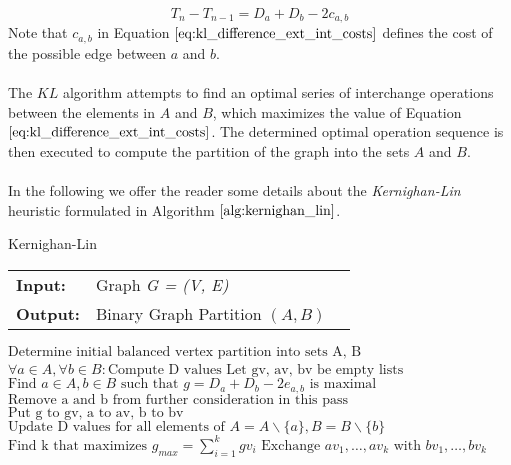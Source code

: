 \begin{equation}
	T_{n} - T_{n-1} = D_a + D_b - 2c_{a,b}
\label{eq:kl_difference_ext_int_costs}
\end{equation}
Note that $c_{a,b}$ in Equation $\ref{eq:kl_difference_ext_int_costs}$ defines the cost of the possible edge between $a$ and $b$. \\ \\
The $KL$ algorithm attempts to find an optimal series of interchange operations between the elements in $A$ and $B$, which maximizes the value of Equation $\ref{eq:kl_difference_ext_int_costs}$. The determined optimal operation sequence is then executed to compute the partition of the graph into the sets $A$ and $B$. \\ \\
In the following we offer the reader some details about the \emph{Kernighan-Lin} heuristic formulated in Algorithm $\ref{alg:kernighan_lin}$. 
\begin{algorithm}[H]
\caption{Kernighan-Lin}
\begin{table}[H]
  \begin{tabular}{@{}lll@{}}
    \textbf{Input:} & Graph \emph{G = (V, E)} \\
    \textbf{Output:} & Binary Graph Partition $\left( A, B \right)$ \\
  \end{tabular} 
\end{table}
\setlength{\fboxrule}{0pt} 
\begin{boxedminipage}{1.0\textwidth}
  \begin{algorithmic}[1]
  	  \State $\text{Determine initial balanced vertex partition into sets A, B}$
      \Do
		\State $\forall a \in A, \forall b \in B: \text{Compute D values}$
		\State $\text{Let gv, av, bv be empty lists}$
			\State $\text{Find } a \in A, b \in B \text{ such that } g = D_a + D_b - 2e_{a,b} \text{ is maximal}$
			\State $\text{Remove a and b from further consideration in this pass}$
			\State $\text{Put g to gv, a to av, b to bv}$
			\State $\text{Update D values for all elements of } A = A \backslash \{a\}, B = B \backslash \{b\}$
		\EndFor
		\State $\text{Find k that maximizes } g_{max} = \sum_{i=1}^k gv_i$
			\State $\text{Exchange } av_1,\dots, av_k \text{ with } bv_1,\dots, bv_k$  
		\EndIf	
  \end{algorithmic}
  \end{boxedminipage}
  \vskip1.5pt
\label{alg:kernighan_lin}
\end{algorithm}
